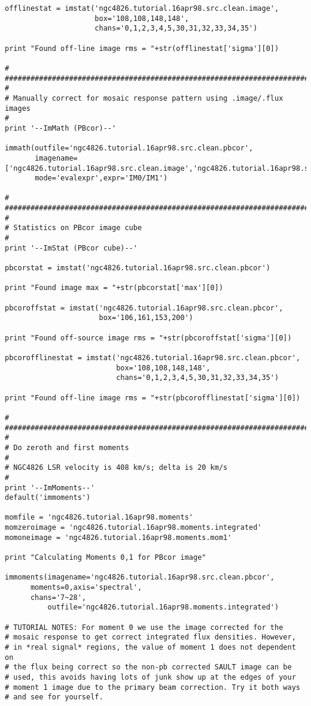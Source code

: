 \begin{verbatim}
offlinestat = imstat('ngc4826.tutorial.16apr98.src.clean.image',
                     box='108,108,148,148',
                     chans='0,1,2,3,4,5,30,31,32,33,34,35')

print "Found off-line image rms = "+str(offlinestat['sigma'][0])

#
##########################################################################
#
# Manually correct for mosaic response pattern using .image/.flux images
#
print '--ImMath (PBcor)--'

immath(outfile='ngc4826.tutorial.16apr98.src.clean.pbcor',
       imagename=['ngc4826.tutorial.16apr98.src.clean.image','ngc4826.tutorial.16apr98.src.clean.flux'],
       mode='evalexpr',expr='IM0/IM1')

#
##########################################################################
#
# Statistics on PBcor image cube
#
print '--ImStat (PBcor cube)--'

pbcorstat = imstat('ngc4826.tutorial.16apr98.src.clean.pbcor')

print "Found image max = "+str(pbcorstat['max'][0])

pbcoroffstat = imstat('ngc4826.tutorial.16apr98.src.clean.pbcor',
                      box='106,161,153,200')

print "Found off-source image rms = "+str(pbcoroffstat['sigma'][0])

pbcorofflinestat = imstat('ngc4826.tutorial.16apr98.src.clean.pbcor',
                          box='108,108,148,148',
                          chans='0,1,2,3,4,5,30,31,32,33,34,35')

print "Found off-line image rms = "+str(pbcorofflinestat['sigma'][0])

#
##########################################################################
#
# Do zeroth and first moments
#
# NGC4826 LSR velocity is 408 km/s; delta is 20 km/s
#
print '--ImMoments--'
default('immoments')

momfile = 'ngc4826.tutorial.16apr98.moments'
momzeroimage = 'ngc4826.tutorial.16apr98.moments.integrated'
momoneimage = 'ngc4826.tutorial.16apr98.moments.mom1'

print "Calculating Moments 0,1 for PBcor image"

immoments(imagename='ngc4826.tutorial.16apr98.src.clean.pbcor',
	  moments=0,axis='spectral',
	  chans='7~28',
          outfile='ngc4826.tutorial.16apr98.moments.integrated') 

# TUTORIAL NOTES: For moment 0 we use the image corrected for the
# mosaic response to get correct integrated flux densities. However,
# in *real signal* regions, the value of moment 1 does not dependent on
# the flux being correct so the non-pb corrected SAULT image can be
# used, this avoids having lots of junk show up at the edges of your
# moment 1 image due to the primary beam correction. Try it both ways
# and see for yourself.


\end{verbatim}

